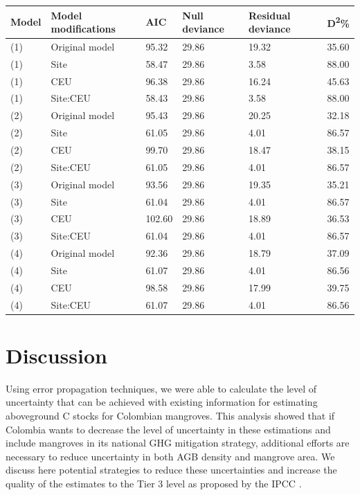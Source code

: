 \documentclass[review, authoryear]{elsarticle}   	%
\begin{document}
\begin{table}[htbp]
   \centering
   \begin{tabular}{p{2cm}p{4cm}p{2cm}p{2cm}p{2cm}p{2cm}}%
      \toprule
       Model  & Model modifications & AIC & Null deviance &Residual deviance & D\textsuperscript{2}\%\\
      \midrule
     (1) & Original model & 95.32& 29.86 & 19.32 & 35.60 \\
     (1) & Site & 58.47 & 29.86 & 3.58 & 88.00 \\
     (1) & CEU & 96.38 & 29.86 &16.24& 45.63 \\
     (1) & Site:CEU & 58.43 & 29.86 & 3.58 & 88.00 \\     
     (2) & Original model & 95.43 & 29.86 & 20.25 & 32.18 \\
     (2) & Site & 61.05 & 29.86 & 4.01 & 86.57 \\
     (2) & CEU & 99.70 & 29.86 & 18.47 & 38.15 \\
     (2) & Site:CEU & 61.05& 29.86 & 4.01 & 86.57 \\          
     (3) & Original model & 93.56 & 29.86 & 19.35 & 35.21 \\
     (3) & Site & 61.04 & 29.86 & 4.01 & 86.57 \\     
     (3) & CEU & 102.60& 29.86 & 18.89 & 36.53 \\     
     (3) & Site:CEU & 61.04 & 29.86 & 4.01 & 86.57 \\          
     (4) & Original model & 92.36 & 29.86 & 18.79 & 37.09 \\
     (4) & Site & 	61.07 & 29.86 & 4.01 & 86.56 \\
     (4) & CEU & 98.58 & 29.86 & 17.99 & 39.75 \\
     (4) & Site:CEU & 61.07 & 29.86 & 4.01 & 86.56 \\
      \bottomrule
  \end{tabular}
   \label{tab:multilevel}
\end{table}


\section{Discussion}
Using error propagation techniques, we were able to calculate the level of uncertainty that can be achieved with existing information for estimating aboveground C stocks for Colombian mangroves. This analysis showed that if Colombia wants to decrease the level of uncertainty in these estimations and include mangroves in its national GHG mitigation strategy, additional efforts are necessary to reduce uncertainty in both AGB density and mangrove area. We discuss here potential strategies to reduce these uncertainties and increase the quality of the estimates  to the Tier 3 level  as proposed by the IPCC \citep{IPCC2003, IPCC2006}. 
\end{document}
